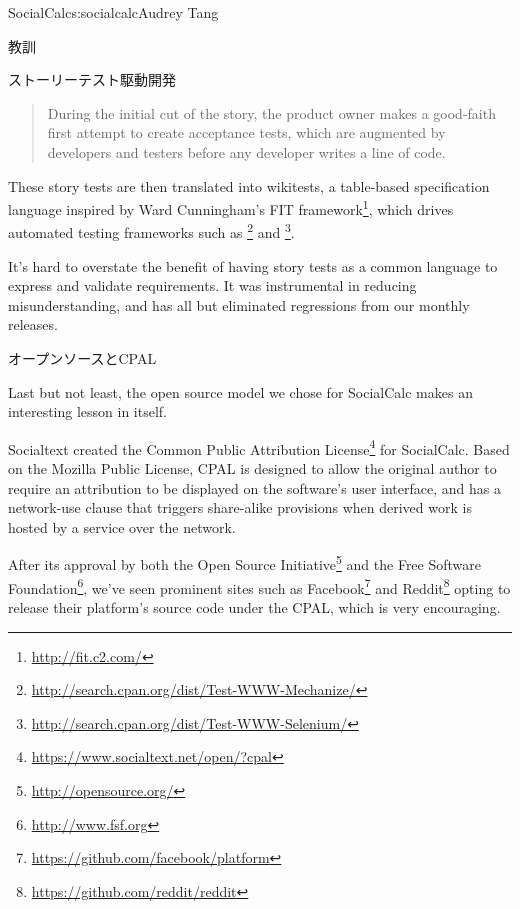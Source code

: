 \begin{aosachapter}{SocialCalc}{s:socialcalc}{Audrey Tang}
\begin{aosasect1}{教訓}
\begin{aosasect2}{ストーリーテスト駆動開発}
\begin{quotation}
  During the initial cut of the story, the product owner makes a
  good-faith first attempt to create acceptance tests, which are
  augmented by developers and testers before any developer writes
  a line of code.

\end{quotation}

These story tests are then translated into wikitests, a table-based
specification language inspired by Ward Cunningham's FIT
framework\footnote{\url{http://fit.c2.com/}}, which drives automated
testing frameworks such as
\footnote{\url{http://search.cpan.org/dist/Test-WWW-Mechanize/}}
and
\footnote{\url{http://search.cpan.org/dist/Test-WWW-Selenium/}}.

It's hard to overstate the benefit of having story tests as a common
language to express and validate requirements. It was instrumental in
reducing misunderstanding, and has all but eliminated regressions from
our monthly releases.

\end{aosasect2}


\begin{aosasect2}{オープンソースとCPAL}

Last but not least, the open source model we chose for SocialCalc
makes an interesting lesson in itself.


Socialtext created the Common Public Attribution
License\footnote{\url{https://www.socialtext.net/open/?cpal}} for
SocialCalc.  Based on the Mozilla Public License, CPAL is designed to
allow the original author to require an attribution to be displayed
on the software's user interface, and has a network-use clause that
triggers share-alike provisions when derived work is hosted by a
service over the network.


After its approval by both the Open Source
Initiative\footnote{\url{http://opensource.org/}} and the Free
Software Foundation\footnote{\url{http://www.fsf.org}}, we've seen prominent
sites such as Facebook\footnote{\url{https://github.com/facebook/platform}}
and Reddit\footnote{\url{https://github.com/reddit/reddit}} opting to release
their platform's source code under the CPAL, which is very
encouraging.


\end{aosasect2}
\end{aosasect1}
\end{aosachapter}
